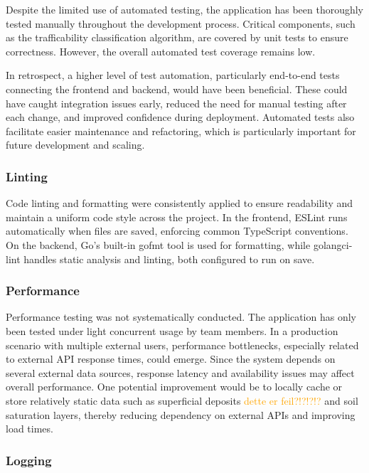 Despite the limited use of automated testing, the application has been thoroughly tested manually throughout the development process. Critical components, such as the trafficability classification algorithm, are covered by unit tests to ensure correctness. However, the overall automated test coverage remains low.

In retrospect, a higher level of test automation, particularly end-to-end tests connecting the frontend and backend, would have been beneficial. These could have caught integration issues early, reduced the need for manual testing after each change, and improved confidence during deployment. Automated tests also facilitate easier maintenance and refactoring, which is particularly important for future development and scaling.

\subsubsection*{Linting}

Code linting and formatting were consistently applied to ensure readability and maintain a uniform code style across the project. In the frontend, ESLint runs automatically when files are saved, enforcing common TypeScript conventions. On the backend, Go's built-in gofmt tool is used for formatting, while golangci-lint handles static analysis and linting, both configured to run on save.

\subsubsection*{Performance}

Performance testing was not systematically conducted. The application has only been tested under light concurrent usage by team members. In a production scenario with multiple external users, performance bottlenecks, especially related to external API response times, could emerge. Since the system depends on several external data sources, response latency and availability issues may affect overall performance. One potential improvement would be to locally cache or store relatively static data such as superficial deposits \textcolor{orange}{dette er feil?!?!?!?} and soil saturation layers, thereby reducing dependency on external APIs and improving load times.

\subsubsection*{Logging}

